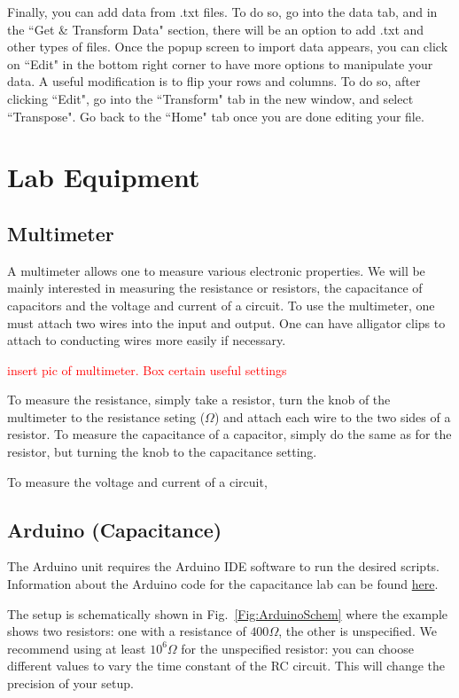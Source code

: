 \documentclass[12pt]{report}
\def \todo #1{\textcolor{red}{#1}}
\begin{document}
Finally, you can add data from .txt files. To do so, go into the data tab, and in the ``Get \& Transform Data" section, there will be an option to add .txt and other types of files. Once the popup screen to import data appears, you can click on ``Edit" in the bottom right corner to have more options to manipulate your data. A useful modification is to flip your rows and columns. To do so, after clicking ``Edit", go into the ``Transform" tab in the new window, and select ``Transpose". Go back to the ``Home" tab once you are done editing your file.


{}
\chapter*{Lab Equipment}

{}
\section*{Multimeter}
A multimeter allows one to measure various electronic properties. We will be mainly interested in measuring the resistance or resistors, the capacitance of capacitors and the voltage and current of a circuit. To use the multimeter, one must attach two wires into the input and output. One can have alligator clips to attach to conducting wires more easily if necessary.

\todo{insert pic of multimeter. Box certain useful settings}

To measure the resistance, simply take a resistor, turn the knob of the multimeter to the resistance seting ($\Omega$) and attach each wire to the two sides of a resistor. To measure the capacitance of a capacitor, simply do the same as for the resistor, but turning the knob to the capacitance setting.

To measure the voltage and current of a circuit,

{}
\section*{Arduino (Capacitance)}
The Arduino unit requires the Arduino IDE software to run the desired scripts. Information about the Arduino code for the capacitance lab can be found \href{https://www.arduino.cc/en/Tutorial/CapacitanceMeter}{here}.

The setup is schematically shown in Fig.~\ref{Fig:ArduinoSchem} where the example shows two resistors: one with a resistance of $400 \Omega$, the other is unspecified. We recommend using at least $10^6 \Omega$ for the unspecified resistor: you can choose different values to vary the time constant of the RC circuit. This will change the precision of your setup.
\end{document}
